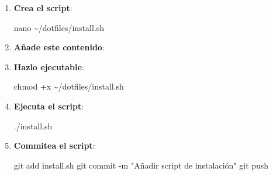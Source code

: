 \documentclass[
  jou,
  floatsintext,
  longtable,
  a4paper,
  nolmodern,
  notxfonts,
  notimes,
  colorlinks=true,linkcolor=blue,citecolor=blue,urlcolor=blue]{apa7}
\newenvironment{Shaded}{\begin{snugshade}}{\end{snugshade}}
\newcommand{\AttributeTok}[1]{\textcolor[rgb]{0.40,0.45,0.13}{#1}}
\newcommand{\BuiltInTok}[1]{\textcolor[rgb]{0.00,0.23,0.31}{#1}}
\newcommand{\CommentTok}[1]{\textcolor[rgb]{0.37,0.37,0.37}{#1}}
\newcommand{\ControlFlowTok}[1]{\textcolor[rgb]{0.00,0.23,0.31}{\textbf{#1}}}
\newcommand{\ExtensionTok}[1]{\textcolor[rgb]{0.00,0.23,0.31}{#1}}
\newcommand{\FunctionTok}[1]{\textcolor[rgb]{0.28,0.35,0.67}{#1}}
\newcommand{\KeywordTok}[1]{\textcolor[rgb]{0.00,0.23,0.31}{\textbf{#1}}}
\newcommand{\NormalTok}[1]{\textcolor[rgb]{0.00,0.23,0.31}{#1}}
\newcommand{\OperatorTok}[1]{\textcolor[rgb]{0.37,0.37,0.37}{#1}}
\newcommand{\OtherTok}[1]{\textcolor[rgb]{0.00,0.23,0.31}{#1}}
\newcommand{\StringTok}[1]{\textcolor[rgb]{0.13,0.47,0.30}{#1}}
\newcommand{\VariableTok}[1]{\textcolor[rgb]{0.07,0.07,0.07}{#1}}
\begin{document}
\begin{enumerate}
\def\labelenumi{\arabic{enumi}.}
\item
  \textbf{Crea el script}:

\begin{Shaded}
\begin{Highlighting}[]
\FunctionTok{nano}\NormalTok{ \textasciitilde{}/dotfiles/install.sh}
\end{Highlighting}
\end{Shaded}
\item
  \textbf{Añade este contenido}:

\begin{Shaded}
\end{Shaded}
\item
  \textbf{Hazlo ejecutable}:

\begin{Shaded}
\begin{Highlighting}[]
\FunctionTok{chmod}\NormalTok{ +x \textasciitilde{}/dotfiles/install.sh}
\end{Highlighting}
\end{Shaded}
\item
  \textbf{Ejecuta el script}:

\begin{Shaded}
\begin{Highlighting}[]
\ExtensionTok{./install.sh}
\end{Highlighting}
\end{Shaded}
\item
  \textbf{Commitea el script}:

\begin{Shaded}
\begin{Highlighting}[]
\FunctionTok{git}\NormalTok{ add install.sh}
\FunctionTok{git}\NormalTok{ commit }\AttributeTok{{-}m} \StringTok{"Añadir script de instalación"}
\FunctionTok{git}\NormalTok{ push}
\end{Highlighting}
\end{Shaded}
\end{enumerate}
\end{document}
